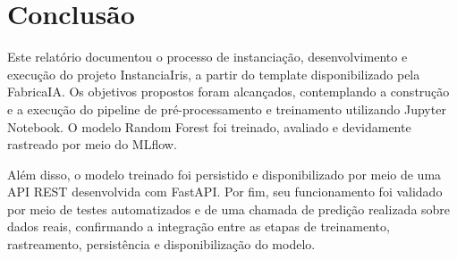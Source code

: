 \documentclass[12pt]{article}
\begin{document}
\section{Conclusão}
Este relatório documentou o processo de instanciação, desenvolvimento e execução do projeto 
InstanciaIris, a partir do template disponibilizado pela 
FabricaIA. Os objetivos propostos foram alcançados, contemplando a construção 
e a execução do pipeline de pré-processamento e treinamento utilizando Jupyter Notebook. 
O modelo Random Forest foi treinado, avaliado e devidamente rastreado por meio do 
MLflow.

Além disso, o modelo treinado foi persistido e disponibilizado por meio de uma API REST 
desenvolvida com FastAPI. Por fim, seu funcionamento foi validado por meio 
de testes automatizados e de uma chamada de predição realizada sobre dados reais, 
confirmando a integração entre as etapas de treinamento, rastreamento, persistência e 
disponibilização do modelo.



\end{document}
